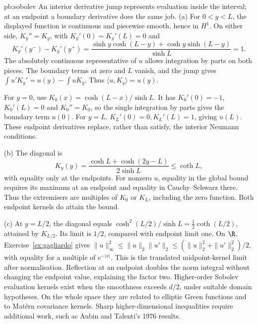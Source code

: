 \begin{solution}{pb:sobolev}
\idea An interior derivative jump represents evaluation inside the interval; at an endpoint a boundary derivative does the same job.
\writeup (a) For $0<y<L$, the displayed function is continuous and piecewise smooth, hence in $H^1$. On either side, $K_y''=K_y$, with $K_y'(0)=K_y'(L)=0$ and
\[K_y'(y^-)-K_y'(y^+)
 =\frac{\sinh y\cosh(L-y)+\cosh y\sinh(L-y)}{\sinh L}=1.
\]
The absolutely continuous representative of $u$ allows integration by parts on both pieces. The boundary terms at zero and $L$ vanish, and the jump gives $\int u'K_y'=u(y)-\int uK_y$. Thus $\langle u,K_y\rangle=u(y)$.

For $y=0$, use $K_0(x)=\cosh(L-x)/\sinh L$. It has $K_0'(0)=-1$, $K_0'(L)=0$ and $K_0''=K_0$, so the single integration by parts gives the boundary term $u(0)$. For $y=L$, $K_L'(0)=0,K_L'(L)=1$, giving $u(L)$. These endpoint derivatives replace, rather than satisfy, the interior Neumann conditions.

(b) The diagonal is
\[K_y(y)=\frac{\cosh L+\cosh(2y-L)}{2\sinh L}\le\coth L,
\]
with equality only at the endpoints. For nonzero $u$, equality in the global bound requires its maximum at an endpoint and equality in Cauchy--Schwarz there. Thus the extremisers are multiples of $K_0$ or $K_L$, including the zero function. Both endpoint kernels do attain the bound.

(c) At $y=L/2$, the diagonal equals $\cosh^2(L/2)/\sinh L=\tfrac12\coth(L/2)$, attained by $K_{L/2}$. Its limit is $1/2$, compared with endpoint limit one. On $\R$, Exercise~\ref{ex:gagliardo} gives $\|u\|_\infty^2\le\|u\|_2\|u'\|_2\le(\|u\|_2^2+\|u'\|_2^2)/2$, with equality for a multiple of $e^{-|x|}$. This is the translated midpoint-kernel limit after normalisation. Reflection at an endpoint doubles the norm integral without changing the endpoint value, explaining the factor two.
\leads Higher-order Sobolev evaluation kernels exist when the smoothness exceeds $d/2$, under suitable domain hypotheses. On the whole space they are related to elliptic Green functions and to Mat\'ern covariance kernels. Sharp higher-dimensional inequalities require additional work, such as Aubin and Talenti's 1976 results.
\end{solution}

